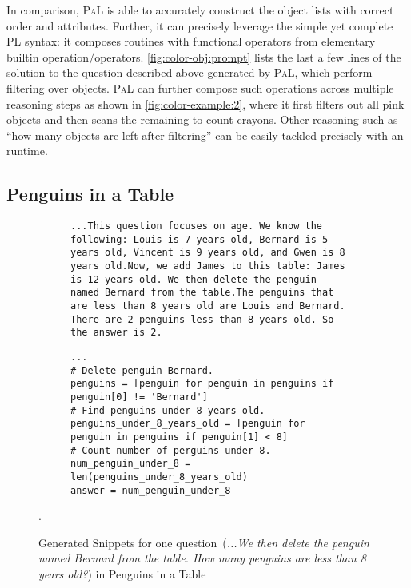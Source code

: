 \documentclass[dvipsnames]{article} \usepackage[accepted]{icml2022}
\newcommand{\ours}{\textsc{PaL}\xspace}
\begin{document}
     In comparison, \ours is able to accurately construct the object lists with correct order and attributes. 
     Further, it can precisely leverage the simple yet complete PL syntax: it composes routines with functional operators from elementary builtin operation/operators. 
     \autoref{fig:color-obj:prompt} lists the last a few lines of the solution to the question described above generated by \ours, which perform filtering over objects. 
     \ours can further compose such operations across multiple reasoning steps as shown in \autoref{fig:color-example:2}, where it first filters out all pink objects and then scans the remaining to count crayons.
     Other reasoning such as ``how many objects are left after filtering'' can be easily tackled precisely with an runtime. 

\subsection{Penguins in a Table} 
 \begin{figure*}[!h]
\centering

\begin{subfigure}[t]{.95\textwidth}
\centering
\begin{verbatim}
...This question focuses on age. We know the following: Louis is 7 years old, Bernard is 5 years old, Vincent is 9 years old, and Gwen is 8 years old.Now, we add James to this table: James is 12 years old. We then delete the penguin named Bernard from the table.The penguins that are less than 8 years old are Louis and Bernard. There are 2 penguins less than 8 years old. So the answer is 2.
\end{verbatim}
\end{subfigure}

\begin{subfigure}[t]{.95\textwidth}

\begin{verbatim}
...
# Delete penguin Bernard.
penguins = [penguin for penguin in penguins if penguin[0] != 'Bernard']
# Find penguins under 8 years old.
penguins_under_8_years_old = [penguin for penguin in penguins if penguin[1] < 8]
# Count number of perguins under 8.
num_penguin_under_8 = len(penguins_under_8_years_old)
answer = num_penguin_under_8
\end{verbatim}
\end{subfigure}
\caption{Generated Snippets for one question~(\textit{...We then delete the penguin named Bernard from the table. How many penguins are less than 8 years old?}) in Penguins in a Table}.
\label{fig:penguin:snippet}
 \end{figure*}
\end{document}
